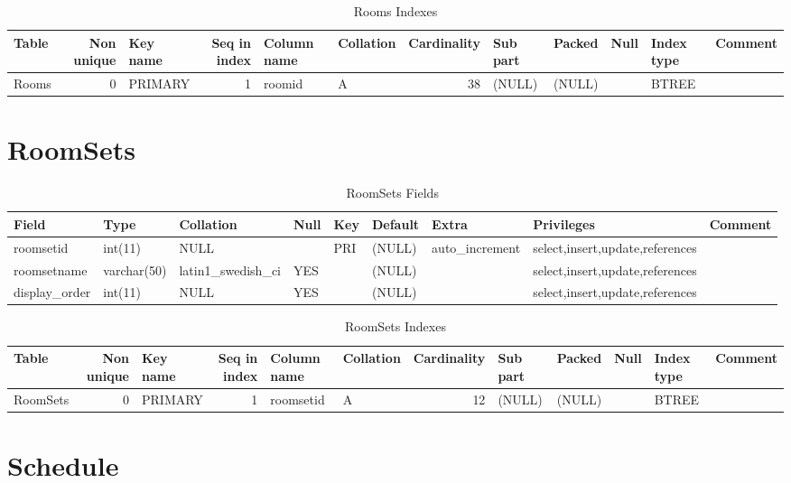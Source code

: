 \documentclass[captions=tablesignature]{scrartcl}
\begin{document}
\begin{table}[htb]
\caption{\label{tbl:roomsindexes}Rooms Indexes}
\centering
\begin{tabular}{lrlrllrlllll}
\hline
Table & Non unique & Key name & Seq in index & Column name & Collation & Cardinality & Sub part & Packed & Null & Index type & Comment\\
\hline
Rooms & 0 & PRIMARY & 1 & roomid & A & 38 & (NULL) & (NULL) &  & BTREE & \\
\hline
\end{tabular}
\end{table}
\section{RoomSets}
\label{sec-23}

\begin{table}[htb]
\caption{\label{tbl:roomsetsfields}RoomSets Fields}
\centering
\begin{tabular}{lllllllll}
\hline
Field & Type & Collation & Null & Key & Default & Extra & Privileges & Comment\\
\hline
roomsetid & int(11) & NULL &  & PRI & (NULL) & auto\_increment & select,insert,update,references & \\
roomsetname & varchar(50) & latin1\_swedish\_ci & YES &  & (NULL) &  & select,insert,update,references & \\
display\_order & int(11) & NULL & YES &  & (NULL) &  & select,insert,update,references & \\
\hline
\end{tabular}
\end{table}

\begin{table}[htb]
\caption{\label{tbl:roomsetsindexes}RoomSets Indexes}
\centering
\begin{tabular}{lrlrllrlllll}
\hline
Table & Non unique & Key name & Seq in index & Column name & Collation & Cardinality & Sub part & Packed & Null & Index type & Comment\\
\hline
RoomSets & 0 & PRIMARY & 1 & roomsetid & A & 12 & (NULL) & (NULL) &  & BTREE & \\
\hline
\end{tabular}
\end{table}
\section{Schedule}
\label{sec-24}
\end{document}
